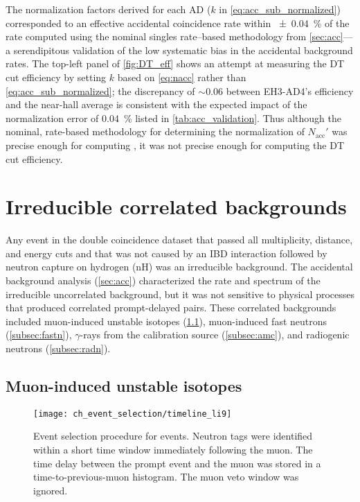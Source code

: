 The normalization factors derived for each AD ($k$ in \cref{eq:acc_sub_normalized})
corresponded to an effective accidental coincidence rate
within \SI{\pm0.04}{\percent} of the rate computed
using the nominal singles rate--based methodology from \cref{sec:acc}---%
a serendipitous validation of the low systematic bias
in the accidental background rates.
The top-left panel of \cref{fig:DT_eff} shows an attempt
at measuring the DT cut efficiency by setting $k$ based on \cref{eq:nacc}
rather than \cref{eq:acc_sub_normalized};
the discrepancy of ${\sim}0.06$ between EH3-AD4's efficiency and the near-hall average
is consistent with the expected impact
of the normalization error of \SI{0.04}{\percent} listed in \cref{tab:acc_validation}.
Thus although the nominal, rate-based methodology
for determining the normalization of $N_\text{acc}'$
was precise enough
for computing \thetaot{},
it was not precise enough for computing the DT cut efficiency.

\section{Irreducible correlated backgrounds}
\label{sec:correlated_bg}

Any event in the double coincidence dataset
that passed all multiplicity, distance, and energy cuts
and that was not caused by an IBD interaction followed by
neutron capture on hydrogen (nH)
was an irreducible background.
The accidental background analysis (\cref{sec:acc})
characterized the rate and spectrum of
the irreducible uncorrelated background,
but it was not sensitive to physical processes that produced
correlated prompt-delayed pairs.
These correlated backgrounds included muon-induced unstable isotopes (\cref{subsec:li9}),
muon-induced fast neutrons (\cref{subsec:fastn}),
$\gamma$-rays from the \amc{} calibration source (\cref{subsec:amc}),
and radiogenic neutrons (\cref{subsec:radn}).

\subsection{Muon-induced unstable isotopes}
\label{subsec:li9}

\begin{figure}
    \centering
    \texttt{[image: ch\_event\_selection/timeline\_li9]}
    \caption[\li{}/\he{} event selection]{
        Event selection procedure for \li{} events.
        Neutron tags were identified within a short time window
        immediately following the muon.
        The time delay between the prompt event and the muon
        was stored in a time-to-previous-muon histogram.
        The muon veto window was ignored.
    }
    \label{fig:li9_timeline}
\end{figure}

